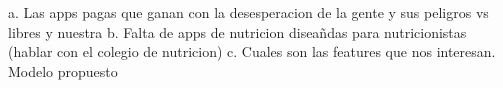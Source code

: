   a.  Las apps pagas que ganan con la desesperacion de la gente y sus peligros vs libres y nuestra
  b. Falta de apps de nutricion diseañdas para nutricionistas (hablar con el colegio de nutricion)
  c. Cuales son las features que nos interesan. Modelo propuesto